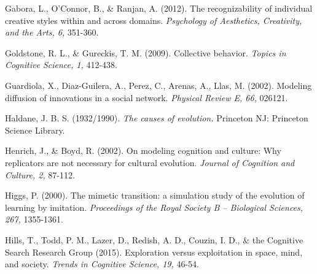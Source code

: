 \documentclass[a4paper,12pt,man,british]{apa6}
\begin{document}
\begin{description}


\item Gabora, L., O'Connor, B., \& Ranjan, A. (2012). The recognizability of individual creative styles within and across domains. \emph{Psychology of Aesthetics, Creativity, and the Arts, 6,} 351-360.


\item Goldstone, R. L., \& Gureckis, T. M. (2009). Collective behavior. \emph{Topics in Cognitive Science, 1,} 412-438.


\item Guardiola, X., Diaz-Guilera, A., Perez, C., Arenas, A., Llas, M. (2002). Modeling diffusion of innovations in a social network. \emph{Physical Review E, 66,} 026121. 

\item Haldane, J. B. S. (1932/1990). \emph{The causes of evolution.} Princeton NJ: Princeton Science Library. 

\item Henrich, J., \& Boyd, R. (2002). On modeling cognition and culture: Why replicators are
not necessary for cultural evolution. \emph{Journal of Cognition and Culture, 2,} 87-112.

\item Higgs, P. (2000). The mimetic transition: a simulation study of the evolution of learning by imitation. \emph{Proceedings of the Royal Society B -- Biological Sciences, 267,} 1355-1361.

\item Hills, T., Todd, P. M., Lazer, D., Redish, A. D., Couzin, I. D., \& the Cognitive Search Research Group (2015). Exploration versus exploitation in space, mind, and society. \emph{Trends in Cognitive Science, 19,} 46-54.


\end{description}
\end{document}
